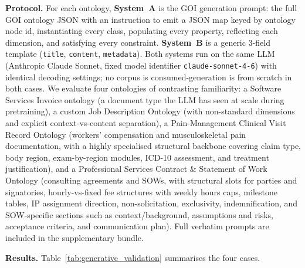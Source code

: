 \documentclass[runningheads,a4paper]{llncs}
\begin{document}
\medskip\noindent\textbf{Protocol.} For each ontology, \textbf{System~A} is the GOI
generation prompt: the full GOI ontology JSON with an instruction to
emit a JSON map keyed by ontology node id, instantiating every class,
populating every property, reflecting each dimension, and satisfying
every constraint. \textbf{System~B} is a generic 3-field template
(\texttt{title}, \texttt{content}, \texttt{metadata}). Both systems
run on the same LLM (Anthropic Claude Sonnet, fixed model identifier
\texttt{claude-sonnet-4-6}) with identical decoding settings; no
corpus is consumed-generation is from scratch in both cases. We
evaluate four ontologies of contrasting familiarity: a Software
Services Invoice ontology (a document type the LLM has seen at scale
during pretraining), a custom Job Description Ontology (with
non-standard dimensions and explicit context-vs-content separation),
a Pain-Management Clinical Visit Record Ontology (workers'
compensation and musculoskeletal pain documentation, with a highly
specialised structural backbone covering claim type, body region,
exam-by-region modules, ICD-10 assessment, and treatment
justification), and a Professional Services Contract \& Statement
of Work Ontology (consulting agreements and SOWs, with structural
slots for parties and signatories, hourly-vs-fixed fee structures
with weekly hours caps, milestone tables, IP assignment direction,
non-solicitation, exclusivity, indemnification, and SOW-specific
sections such as context/background, assumptions and risks,
acceptance criteria, and communication plan). Full verbatim prompts
are included in the supplementary bundle.

\medskip\noindent\textbf{Results.} Table~\ref{tab:generative_validation} summarises
the four cases.
\end{document}
